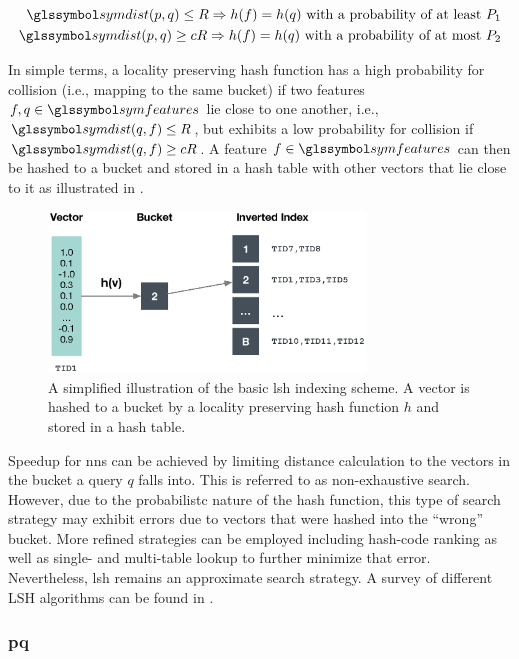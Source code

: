 \begin{eqnarray}
    \symdist (p,q) \leq R \Rightarrow h(f) = h(q) \text{ with a probability of at least } P_1 \label{eq:lsh_1} \\
    \symdist (p,q) \geq cR \Rightarrow h(f) = h(q) \text{ with a probability of at most } P_2 \label{eq:lsh_2}
\end{eqnarray}

In simple terms, a locality preserving hash function has a high probability for collision (i.e., mapping to the same bucket) if two features $f,q \in \symfeatures$ lie close to one another, i.e., $\symdist(q,f) \leq R$, but exhibits a low probability for collision if $\symdist(q,f) \geq cR$. A  feature $f \in \symfeatures$ can then be hashed to a bucket and stored in a hash table with other vectors that lie close to it as illustrated in . 

\begin{figure}[tb]
    \centering
    \includegraphics[width=0.75\textwidth]{figures/lsh}
    \caption{A simplified illustration of the basic \acrshort{lsh} indexing scheme. A vector is hashed to a bucket by a locality preserving hash function $h$ and stored in a hash table.}
    \label{fig:lsh}
\end{figure}

Speedup for \acrshort{nns} can be achieved by limiting distance calculation to the vectors in the bucket a query $q$ falls into. This is referred to as non-exhaustive search. However, due to the probabilistc nature of the hash function, this type of search strategy may exhibit errors due to vectors that were hashed into the ``wrong'' bucket. More refined strategies can be employed including hash-code ranking as well as single- and multi-table lookup \cite{Wang:2017ASurvey} to further minimize that error. Nevertheless, \acrshort{lsh} remains an approximate search strategy. A survey of different LSH algorithms can be found in \cite{Wang:2017ASurvey}.

\subsubsection{\texorpdfstring{\acrfull{pq}}{Product Quantisation (PQ)}}
\label{section:index_pq}

